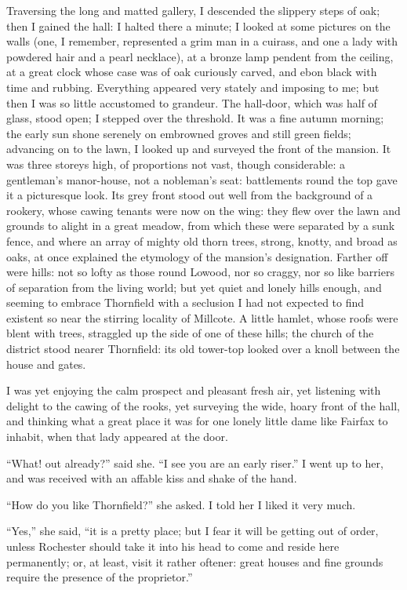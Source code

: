 Traversing the long and matted gallery, I descended the slippery steps
of oak; then I gained the hall: I halted there a minute; I looked at
some pictures on the walls (one, I remember, represented a grim man in a
cuirass, and one a lady with powdered hair and a pearl necklace), at a
bronze lamp pendent from the ceiling, at a great clock whose case was of
oak curiously carved, and ebon black with time and rubbing. Everything
appeared very stately and imposing to me; but then I was so little
accustomed to grandeur. The hall-door, which was half of glass, stood
open; I stepped over the threshold. It was a fine autumn morning; the
early sun shone serenely on embrowned groves and still green fields;
advancing on to the lawn, I looked up and surveyed the front of the
mansion. It was three storeys high, of proportions not vast, though
considerable: a gentleman's manor-house, not a nobleman's seat:
battlements round the top gave it a picturesque look. Its grey front
stood out well from the background of a rookery, whose cawing tenants
were now on the wing: they flew over the lawn and grounds to alight in a
great meadow, from which these were separated by a sunk fence, and where
an array of mighty old thorn trees, strong, knotty, and broad as oaks,
at once explained the etymology of the mansion's designation. Farther
off were hills: not so lofty as those round Lowood, nor so craggy, nor
so like barriers of separation from the living world; but yet quiet and
lonely hills enough, and seeming to embrace Thornfield with a seclusion
I had not expected to find existent so near the stirring locality of
Millcote. A little hamlet, whose roofs were blent with trees, straggled
up the side of one of these hills; the church of the district stood
nearer Thornfield: its old tower-top looked over a knoll between the
house and gates.

I was yet enjoying the calm prospect and pleasant fresh air, yet
listening with delight to the cawing of the rooks, yet surveying the
wide, hoary front of the hall, and thinking what a great place it was
for one lonely little dame like \Mrs{} Fairfax to inhabit, when that lady
appeared at the door.

\enquote{What! out already?} said she. \enquote{I see you are an early
riser.} I went up to her, and was received with an affable kiss and
shake of the hand.

\enquote{How do you like Thornfield?} she asked. I told her I liked it
very much.

\enquote{Yes,} she said, \enquote{it is a pretty place; but I fear it
will be getting out of order, unless \Mr{} Rochester should take it into
his head to come and reside here permanently; or, at least, visit it
rather oftener: great houses and fine grounds require the presence of
the proprietor.}

